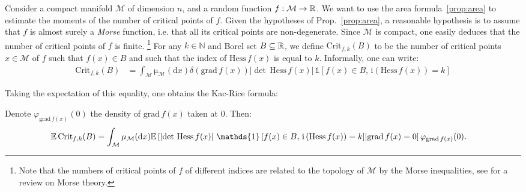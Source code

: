 \documentclass[amsmath,amssymb,nofootinbib,prd]{article}
\begin{document}
	Consider a compact manifold $\mathcal{M}$ of dimension $n$, and a random function $f : \mathcal{M} \to \mathbb{R}$. We want to use the area formula~\ref{prop:area} to estimate the moments of the number of critical points of $f$. Given the hypotheses of Prop.~\ref{prop:area}, a reasonable hypothesis is to assume that $f$ is almost surely a \emph{Morse} function, i.e. that all its critical points are non-degenerate. Since $\mathcal{M}$ is compact, one easily deduces that the number of critical points of $f$ is finite. \footnote{Note that the numbers of critical points of $f$ of different indices are related to the topology of $\mathcal{M}$ by the Morse inequalities, see \cite{milnor1963morse} for a review on Morse theory.} For any $k \in \mathbb{N}$ and Borel set $B \subseteq \mathbb{R}$, we define $\mathrm{Crit}_{f,k}(B)$ to be the number of critical points $x \in \mathcal{M}$ of $f$ such that $f(x) \in B$ and such that the index of $\mathrm{Hess}\, f(x)$ is equal to $k$. Informally, one can write:
	\begin{align}
	\mathrm{Crit}_{f,k}(B) &= \int_{\mathcal{M}} \mathrm{\mu}_{\mathcal{M}}(\mathrm{d}x) \delta\left(\mathrm{grad}\, f(x)\right) \left|\det \, \mathrm{Hess}\, f(x)\right| \, \mathds{1}\left[f(x) \in B,\, \mathrm{i}\left(\mathrm{Hess}\, f(x)\right) = k\right]
	\end{align}
	
	Taking the expectation of this equality, one obtains the Kac-Rice formula:
	\begin{proposition}\label{prop:KR}Denote  $\varphi_{\mathrm{grad}\, f(x)}(0)$ the density of $\mathrm{grad}\, f(x)$ taken at $0$. Then:
	\begin{align*}
	\EE \, \mathrm{Crit}_{f,k}(B) &= \int_{\mathcal{M}} \mathrm{\mu}_{\mathcal{M}}(\mathrm{d}x) \EE \left[\left|\det \, \mathrm{Hess}\, f(x)\right| \, \mathds{1}\left[f(x) \in B,\, \mathrm{i}\left(\mathrm{Hess}\, f(x)\right) = k\right] \middle| \mathrm{grad}\, f(x) = 0 \right] \varphi_{\mathrm{grad}\, f(x)}(0).
	\end{align*}
	\end{proposition}\vspace{0.cm}
	
\end{document}

